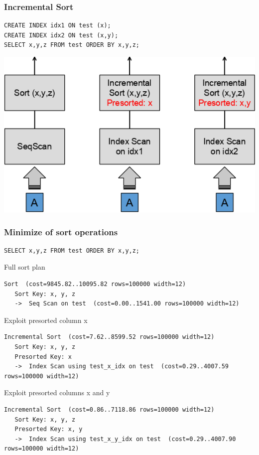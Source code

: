 \documentclass{beamer}
\begin{document}
\begin{frame}[fragile]\frametitle{Incremental Sort}
\begin{lstlisting}
CREATE INDEX idx1 ON test (x);
CREATE INDEX idx2 ON test (x,y);
SELECT x,y,z FROM test ORDER BY x,y,z;
\end{lstlisting}
  \centerline{\includegraphics[scale=0.6]{pics/incremental_sort.png}}
\end{frame}

\begin{frame}[fragile]\frametitle{Minimize of sort operations}
\begin{lstlisting}
SELECT x,y,z FROM test ORDER BY x,y,z;
\end{lstlisting}
\begin{block}{Full sort plan}
\begin{lstlisting}[basicstyle=\tiny]
 Sort  (cost=9845.82..10095.82 rows=100000 width=12)
   Sort Key: x, y, z
   ->  Seq Scan on test  (cost=0.00..1541.00 rows=100000 width=12)
\end{lstlisting}
\end{block}
\begin{block}{Exploit presorted column x}
\begin{lstlisting}[basicstyle=\tiny]
 Incremental Sort  (cost=7.62..8599.52 rows=100000 width=12)
   Sort Key: x, y, z
   Presorted Key: x
   ->  Index Scan using test_x_idx on test  (cost=0.29..4007.59 rows=100000 width=12)
\end{lstlisting}
\end{block}
\begin{block}{Exploit presorted columns x and y}
\begin{lstlisting}[basicstyle=\tiny]
 Incremental Sort  (cost=0.86..7118.86 rows=100000 width=12)
   Sort Key: x, y, z
   Presorted Key: x, y
   ->  Index Scan using test_x_y_idx on test  (cost=0.29..4007.90 rows=100000 width=12)
\end{lstlisting}
\end{block}
\end{frame}
\end{document}
